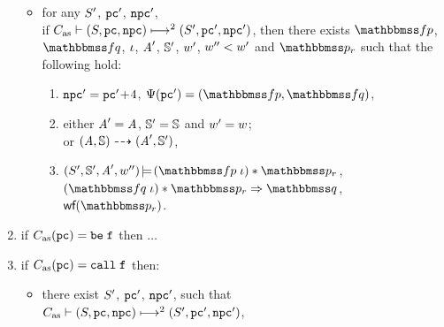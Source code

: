\begin{definition}
\begin{enumerate}[1.]
\begin{itemize}
                \item for any $\state'$, {\em $\pc'$}, {\em $\npc'$}, \\ if
                {\em $\multilptrans{\asmimp}{2}{(\state, \pc, \npc)}{(\state', \pc', \npc')}$},
                then there exists 
                $\relspecpre$, $\relspecpost$, $\lgvl$,
                $\primcom'$, $\hpstate'$, $\word'$,
                $\word'' < \word'$ and {\em $\relastP_r$}
                such that the following hold:
                \begin{enumerate}[(1)]
                    \item %
                        {\em $\npc' = \pc' \!+\! 4$},
                        {\em $\Cspec (\pc') = (\relspecpre, \relspecpost)$},
                    \item either $\primcom' = \primcom$,
                    $\hpstate' = \hpstate$ and $\word' = \word$; \\
                    or
                    $\primTrans{(\primcom, \hpstate)}
                        {(\primcom', \hpstate')}$,
                    \item
                        {\em $\asrtmodel{(\state', \hpstate', \primcom', \word'')}
                        {(\relspecpre \; \lgvl) \sepstar \relastP_r}$},
                        $(\relspecpost \; \lgvl) \sepstar \relastP_r
                        \Rightarrow \relastQ$, {\em $\wfFrm(\relastP_r)$}.
                \end{enumerate}
            \end{itemize}

            \item if {\em $\asmimp(\pc) = \be \; \lab{}$} then $\dots$
		
            \item if {\em $\asmimp (\pc) = \call \; \lab{}$} then:
            \begin{itemize}
                \item there exist {\em $\state'$}, {\em $\pc'$}, {\em $\npc'$}, such that
                \\
                {\em $\multilptrans{\asmimp}{2}{(\state, \pc, \npc)}
                    {(\state', \pc', \npc')}$},


\end{itemize}
\end{enumerate}
\end{definition}

